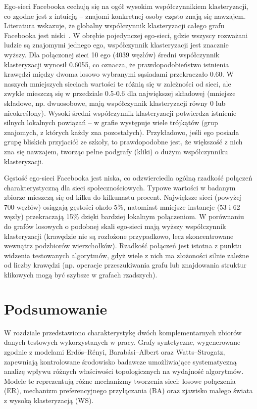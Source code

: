 Ego-sieci Facebooka cechują się na ogół wysokim współczynnikiem klasteryzacji, co zgodne jest z intuicją -- znajomi konkretnej osoby często znają się nawzajem. Literatura wskazuje, że globalny współczynnik klasteryzacji całego grafu Facebooka jest niski~\cite{Ugander2011}. W obrębie pojedynczej ego-sieci, gdzie wszyscy rozważani ludzie są znajomymi jednego ego, współczynnik klasteryzacji jest znacznie wyższy. Dla połączonej sieci 10 ego (4039 węzłów) średni współczynnik klasteryzacji wynosił 0.6055, co oznacza, że prawdopodobieństwo istnienia krawędzi między dwoma losowo wybranymi sąsiadami przekraczało 0.60. W naszych mniejszych sieciach wartości te różnią się w zależności od sieci, ale zwykle mieszczą się w przedziale 0.5-0.6 dla największej składowej (mniejsze składowe, np. dwuosobowe, mają współczynnik klasteryzacji równy 0 lub nieokreślony). Wysoki średni współczynnik klasteryzacji potwierdza istnienie silnych lokalnych powiązań -- w grafie występuje wiele trójkątów (grup znajomych, z których każdy zna pozostałych). Przykładowo, jeśli ego posiada grupę bliskich przyjaciół ze szkoły, to prawdopodobne jest, że większość z nich zna się nawzajem, tworząc pełne podgrafy (kliki) o dużym współczynniku klasteryzacji.

Gęstość ego-sieci Facebooka jest niska, co odzwierciedla ogólną rzadkość połączeń charakterystyczną dla sieci społecznościowych. Typowe wartości w badanym zbiorze mieszczą się od kilku do kilkunastu procent. Największe sieci (powyżej 700 węzłów) osiągają gęstości około 5\%, natomiast mniejsze instancje (53 i 62 węzły) przekraczają 15\% dzięki bardziej lokalnym połączeniom. W porównaniu do grafów losowych o podobnej skali ego-sieci mają wyższy współczynnik klasteryzacji (krawędzie nie są rozłożone przypadkowo, lecz skoncentrowane wewnątrz podzbiorów wierzchołków). Rzadkość połączeń jest istotna z punktu widzenia testowanych algorytmów, gdyż wiele z nich ma złożoności silnie zależne od liczby krawędzi (np. operacje przeszukiwania grafu lub znajdowania struktur klikowych mogą być szybsze w grafach rzadszych).

\section{Podsumowanie}

W rozdziale przedstawiono charakterystykę dwóch komplementarnych zbiorów danych testowych wykorzystanych w pracy. Grafy syntetyczne, wygenerowane zgodnie z modelami Erdős--Rényi, Barabási--Albert oraz Watts--Strogatz, zapewniają kontrolowane środowisko badawcze umożliwiające systematyczną analizę wpływu różnych właściwości topologicznych na wydajność algorytmów. Modele te reprezentują różne mechanizmy tworzenia sieci: losowe połączenia (ER), mechanizm preferencyjnego przyłączania (BA) oraz zjawisko małego świata z wysoką klasteryzacją (WS).

